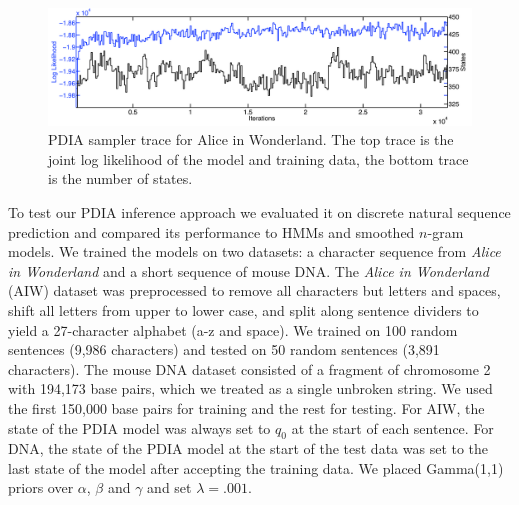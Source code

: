 \begin{figure}[htbp]
\centering
\includegraphics[width=1\textwidth]{results/aiw_sampler_trace}
\caption{PDIA sampler trace for Alice in Wonderland.  The top trace is the joint log likelihood of the model and training data, the bottom trace is the number of states. \label{fig:aiw_sampler_trace}}
\end{figure}
%
To test our PDIA inference approach we evaluated it on discrete natural sequence prediction and compared its performance to HMMs and smoothed $n$-gram models.  We trained the models on two datasets: a character sequence from {\em Alice in Wonderland} \cite{Carroll1865} and a short sequence of mouse DNA.  The {\em Alice in Wonderland} (AIW) dataset was preprocessed to remove all characters but letters and spaces, shift all letters from upper to lower case, and split along sentence dividers to yield a 27-character alphabet (a-z and space).  We trained on 100 random sentences (9,986 characters) and tested on 50 random sentences (3,891 characters).   The mouse DNA dataset consisted of a fragment of chromosome 2 with 194,173 base pairs, which we treated as a single unbroken string.  We used the first 150,000 base pairs for training and the rest for testing.  For AIW, the state of the PDIA model was always set to $q_0$ at the start of each sentence.  For DNA, the state of the PDIA model at the start of the test data was set to the last state of the model after accepting the training data.  We placed Gamma(1,1) priors over $\alpha$, $\beta$ and $\gamma$ and set $\lambda=.001$.

